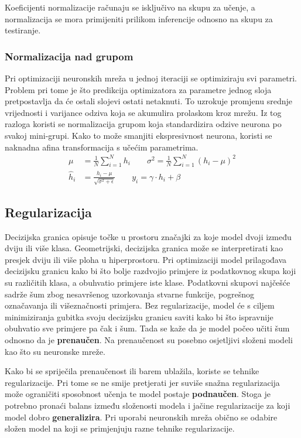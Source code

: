 \documentclass[times, utf8, numeric, diplomski]{fer}
\def\todoimg#1{\begin{center} \textcolor{red}{\big[ IMAGE: \textit{#1} \big]} \end{center}}
\begin{document}
Koeficijenti normalizacije računaju se isključivo na skupu za učenje, a normalizacija se mora primijeniti prilikom inferencije odnosno na skupu za testiranje.

\subsubsection{Normalizacija nad grupom}

Pri optimizaciji neuronskih mreža u jednoj iteraciji se optimiziraju svi parametri. Problem pri tome je što predikcija optimizatora za parametre jednog sloja pretpostavlja da će ostali slojevi ostati netaknuti. To uzrokuje promjenu srednje vrijednosti i varijance odziva koja se akumulira prolaskom kroz mrežu. Iz tog razloga koristi se normalizacija grupom koja standardizira odzive neurona po svakoj mini-grupi. Kako to može smanjiti ekspresivnost neurona, koristi se naknadna afina transformacija s učećim parametrima.
\begin{align}
\mu &= \frac{1}{N} \sum_{i=1}^N h_i \qquad
\sigma^2 = \frac{1}{N} \sum_{i=1}^N (h_i-\mu)^2 \\
\hat{h}_i &= \frac{h_i - \mu}{\sqrt{\sigma^2 + \epsilon}} \qquad
y_i = \gamma \cdot h_i + \beta
\end{align}

\subsection{Regularizacija}
\label{sec:regularizacija}
Decizijska granica opisuje točke u prostoru značajki za koje model dvoji između dviju ili više klasa. Geometrijski, decizijska granica može se interpretirati kao presjek dviju ili više ploha u hiperprostoru. Pri optimizaciji model prilagođava decizijsku granicu kako bi što bolje razdvojio primjere iz podatkovnog skupa koji su različitih klasa, a obuhvatio primjere iste klase. Podatkovni skupovi najčešće sadrže šum zbog nesavršenog uzorkovanja stvarne funkcije, pogrešnog označavanja ili višeznačnosti primjera. Bez regularizacije, model će s ciljem minimiziranja gubitka svoju decizijsku granicu saviti kako bi što ispravnije obuhvatio sve primjere pa čak i šum. Tada se kaže da je model počeo učiti šum odnosno da je \textbf{prenaučen}. Na prenaučenost su posebno osjetljivi složeni modeli kao što su neuronske mreže.

\todoimg{podnaučena, generalizira, prenaučena}

Kako bi se spriječila prenaučenost ili barem ublažila, koriste se tehnike regularizacije. Pri tome se ne smije pretjerati jer suviše snažna regularizacija može ograničiti sposobnost učenja te model postaje \textbf{podnaučen}. Stoga je potrebno pronaći balans između složenosti modela i jačine regularizacije za koji model dobro \textbf{generalizira}. Pri uporabi neuronskih mreža obično se odabire složen model na koji se primjenjuju razne tehnike regularizacije.
\end{document}

